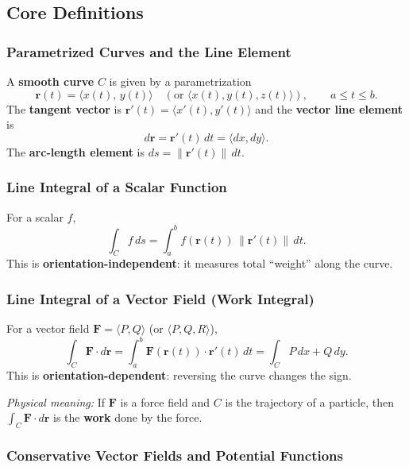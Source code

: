 \documentclass[11pt]{article}
\begin{document}
\subsection{Core Definitions}

\subsubsection*{Parametrized Curves and the Line Element}

A \textbf{smooth curve} $C$ is given by a parametrization
\[
  \mathbf{r}(t) = \langle x(t),\, y(t) \rangle \quad (\text{or } \langle x(t),y(t),z(t)\rangle),
  \qquad a \le t \le b.
\]
The \textbf{tangent vector} is $\mathbf{r}'(t) = \langle x'(t), y'(t) \rangle$ and the \textbf{vector line element} is
\[
  d\mathbf{r} = \mathbf{r}'(t)\,dt = \langle dx, dy \rangle.
\]
The \textbf{arc-length element} is $ds = \|\mathbf{r}'(t)\|\,dt$.

\subsubsection*{Line Integral of a Scalar Function}

For a scalar $f$,
\[
  \int_C f\,ds = \int_a^b f(\mathbf{r}(t))\,\|\mathbf{r}'(t)\|\,dt.
\]
This is \textbf{orientation-independent}: it measures total ``weight'' along the curve.

\subsubsection*{Line Integral of a Vector Field (Work Integral)}

For a vector field $\mathbf{F} = \langle P, Q \rangle$ (or $\langle P,Q,R\rangle$),
\[
  \int_C \mathbf{F}\cdot d\mathbf{r}
  = \int_a^b \mathbf{F}(\mathbf{r}(t))\cdot\mathbf{r}'(t)\,dt
  = \int_C P\,dx + Q\,dy.
\]
This is \textbf{orientation-dependent}: reversing the curve changes the sign.

\textit{Physical meaning:} If $\mathbf{F}$ is a force field and $C$ is the trajectory of a particle, then $\int_C \mathbf{F}\cdot d\mathbf{r}$ is the \textbf{work} done by the force.

\subsubsection*{Conservative Vector Fields and Potential Functions}
\end{document}
